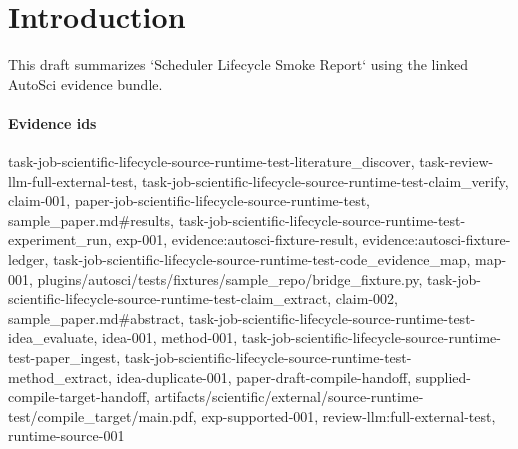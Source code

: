 \section{Introduction}
This draft summarizes `Scheduler Lifecycle Smoke Report` using the linked AutoSci evidence bundle.

\paragraph{Evidence ids} task-job-scientific-lifecycle-source-runtime-test-literature\_discover, task-review-llm-full-external-test, task-job-scientific-lifecycle-source-runtime-test-claim\_verify, claim-001, paper-job-scientific-lifecycle-source-runtime-test, sample\_paper.md\#results, task-job-scientific-lifecycle-source-runtime-test-experiment\_run, exp-001, evidence:autosci-fixture-result, evidence:autosci-fixture-ledger, task-job-scientific-lifecycle-source-runtime-test-code\_evidence\_map, map-001, plugins/autosci/tests/fixtures/sample\_repo/bridge\_fixture.py, task-job-scientific-lifecycle-source-runtime-test-claim\_extract, claim-002, sample\_paper.md\#abstract, task-job-scientific-lifecycle-source-runtime-test-idea\_evaluate, idea-001, method-001, task-job-scientific-lifecycle-source-runtime-test-paper\_ingest, task-job-scientific-lifecycle-source-runtime-test-method\_extract, idea-duplicate-001, paper-draft-compile-handoff, supplied-compile-target-handoff, artifacts/scientific/external/source-runtime-test/compile\_target/main.pdf, exp-supported-001, review-llm:full-external-test, runtime-source-001
